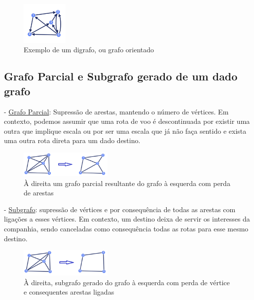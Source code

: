 \begin{figure}[h]
    \centering
    \includegraphics[width=0.2\textwidth]{imgs/Figura5}
    \caption{Exemplo de um digrafo, ou grafo orientado\label{fig:imagem5}}
\end{figure}

\subsection{Grafo Parcial e Subgrafo gerado de um dado grafo}
- \underline{Grafo Parcial}: Supressão de arestas, mantendo o número de vértices. Em contexto, podemos assumir 
que uma rota de voo é descontinuada por existir uma outra que implique escala ou por ser uma escala que já 
não faça sentido e exista uma outra rota direta para um dado destino.\\
\begin{figure}[h]
    \centering
    \includegraphics[width=0.4\textwidth]{imgs/Figura6}
    \caption{ À direita um grafo parcial resultante do grafo à esquerda com perda de arestas\label{fig:imagem6}}
\end{figure}
\linebreak
\indent - \underline{Subgrafo}: supressão de vértices e por consequência de todas as arestas com ligações a esses vértices. 
Em contexto, um destino deixa de servir os interesses da companhia, sendo canceladas como consequência 
todas as rotas para esse mesmo destino.
\linebreak
\begin{figure}[h]
    \centering
    \includegraphics[width=0.4\textwidth]{imgs/Figura7}
    \caption{ À direita, subgrafo gerado do grafo à esquerda com perda de vértice e consequentes arestas ligadas\label{fig:imagem7}}
\end{figure}
\clearpage
